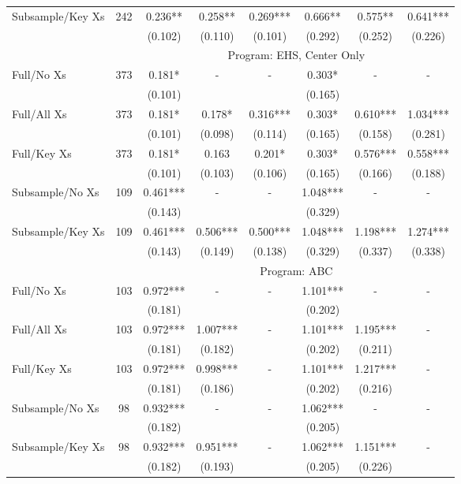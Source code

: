 \begin{tabular}{lccccccc}
Subsample/Key Xs & 242 & 0.236** & 0.258** & 0.269*** & 0.666** & 0.575** & 0.641*** \\
 &  & (0.102) & (0.110) & (0.101) & (0.292) & (0.252) & (0.226) \\
\midrule 
 &  & \multicolumn{6}{c}{Program: EHS, Center Only} \\
 \cmidrule(lr){3-8} 
Full/No Xs & 373 & 0.181* & - & - & 0.303* & - & - \\
 &  & (0.101) &  &  & (0.165) &  &  \\
Full/All Xs & 373 & 0.181* & 0.178* & 0.316*** & 0.303* & 0.610*** & 1.034*** \\
 &  & (0.101) & (0.098) & (0.114) & (0.165) & (0.158) & (0.281) \\
Full/Key Xs & 373 & 0.181* & 0.163 & 0.201* & 0.303* & 0.576*** & 0.558*** \\
 &  & (0.101) & (0.103) & (0.106) & (0.165) & (0.166) & (0.188) \\
Subsample/No Xs & 109 & 0.461*** & - & - & 1.048*** & - & - \\
 &  & (0.143) &  &  & (0.329) &  &  \\
Subsample/Key Xs & 109 & 0.461*** & 0.506*** & 0.500*** & 1.048*** & 1.198*** & 1.274*** \\
 &  & (0.143) & (0.149) & (0.138) & (0.329) & (0.337) & (0.338) \\
\midrule 
 &  & \multicolumn{6}{c}{Program: ABC} \\
 \cmidrule(lr){3-8} 
Full/No Xs & 103 & 0.972*** & - & - & 1.101*** & - & - \\
 &  & (0.181) &  &  & (0.202) &  &  \\
Full/All Xs & 103 & 0.972*** & 1.007*** & - & 1.101*** & 1.195*** & - \\
 &  & (0.181) & (0.182) &  & (0.202) & (0.211) &  \\
Full/Key Xs & 103 & 0.972*** & 0.998*** & - & 1.101*** & 1.217*** & - \\
 &  & (0.181) & (0.186) &  & (0.202) & (0.216) &  \\
Subsample/No Xs & 98 & 0.932*** & - & - & 1.062*** & - & - \\
 &  & (0.182) &  &  & (0.205) &  &  \\
Subsample/Key Xs & 98 & 0.932*** & 0.951*** & - & 1.062*** & 1.151*** & - \\
 &  & (0.182) & (0.193) &  & (0.205) & (0.226) &  \\
\midrule 
\bottomrule 
\end{tabular}
